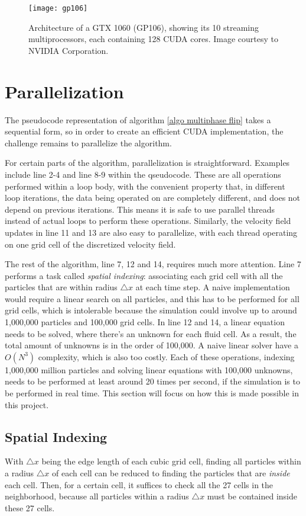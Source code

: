 \begin{figure}[H]
    \centering
    \texttt{[image: gp106]}
    \caption{Architecture of a GTX 1060 (GP106), showing its 10 streaming multiprocessors, each containing 128 CUDA cores. Image courtesy to NVIDIA Corporation.}
    \label{figure GTX1060}
\end{figure}



\section{Parallelization}
The pseudocode representation of algorithm \ref{algo multiphase flip} takes a sequential form, so in order to create an efficient CUDA implementation, the challenge remains to parallelize the algorithm.

For certain parts of the algorithm, parallelization is straightforward. Examples include line 2-4 and line 8-9 within the qseudocode. These are all operations performed within a loop body, with the convenient property that, in different loop iterations, the data being operated on are completely different, and does not depend on previous iterations. This means it is safe to use parallel threads instead of actual loops to perform these operations. Similarly, the velocity field updates in line 11 and 13 are also easy to parallelize, with each thread operating on one grid cell of the discretized velocity field. 

The rest of the algorithm, line 7, 12 and 14, requires much more attention. Line 7 performs a task called \textit{spatial indexing}: associating each grid cell with all the particles that are within radius $\triangle x$ at each time step. A naive implementation would require a linear search on all particles, and this has to be performed for all grid cells, which is intolerable because the simulation could involve up to around 1,000,000 particles and 100,000 grid cells. In line 12 and 14, a linear equation needs to be solved, where there's an unknown for each fluid cell. As a result, the total amount of unknowns is in the order of 100,000. A naive linear solver have a $O(N^3)$ complexity, which is also too costly. Each of these operations, indexing 1,000,000 million particles and solving linear equations with 100,000 unknowns, needs to be performed at least around 20 times per second, if the simulation is to be performed in real time. This section will focus on how this is made possible in this project.

\subsection{Spatial Indexing}
\label{subsection spatial indexing}
With $\triangle x$ being the edge length of each cubic grid cell, finding all particles within a radius $\triangle x$ of each cell can be reduced to finding the particles that are \textit{inside} each cell. Then, for a certain cell, it suffices to check all the 27 cells in the neighborhood, because all particles within a radius $\triangle x$ must be contained inside these 27 cells. 


